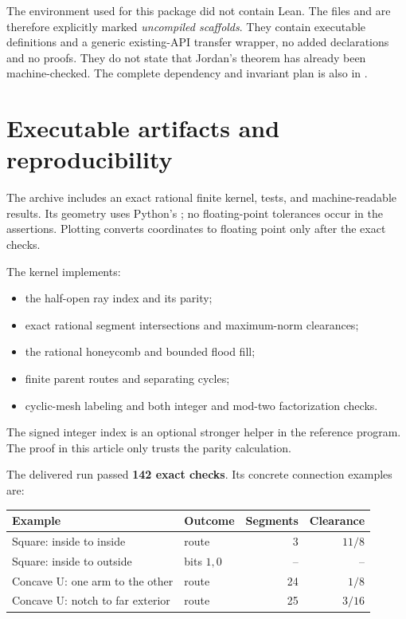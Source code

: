 The environment used for this package did not contain Lean.
The files  and
 are therefore explicitly marked
\emph{uncompiled scaffolds}. They contain executable definitions
and a generic existing-API transfer wrapper, no added
 declarations and no  proofs.
They do not state that Jordan's theorem has already been
machine-checked. The complete dependency and invariant plan
is also in .

\section{Executable artifacts and reproducibility}\label{sec:artifacts}

The archive includes an exact rational finite kernel, tests, and
machine-readable results. Its geometry uses Python's
; no floating-point tolerances occur in
the assertions. Plotting converts coordinates to floating point
only after the exact checks.

The kernel implements:
\begin{itemize}
\item the half-open ray index and its parity;
\item exact rational segment intersections and maximum-norm
clearances;
\item the rational honeycomb and bounded flood fill;
\item finite parent routes and separating cycles;
\item cyclic-mesh labeling and both integer and mod-two
factorization checks.
\end{itemize}
The signed integer index is an optional stronger helper in the
reference program. The proof in this article only trusts the
parity calculation.

The delivered run passed \textbf{142 exact checks}. Its concrete
connection examples are:

\begin{center}
\begin{tabular}{@{}p{}p{}rr@{}}
\toprule
Example & Outcome & Segments & Clearance\\
\midrule
Square: inside to inside & route & 3 & $11/8$\\
Square: inside to outside & bits $1,0$ & -- & --\\
Concave U: one arm to the other & route & 24 & $1/8$\\
Concave U: notch to far exterior & route & 25 & $3/16$\\
\bottomrule
\end{tabular}
\end{center}

